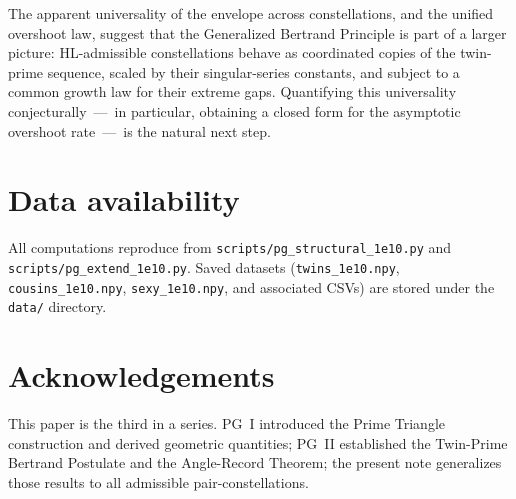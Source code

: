 \documentclass[11pt]{article}
\begin{document}
The apparent universality of the envelope across constellations, and
the unified overshoot law, suggest that the Generalized Bertrand
Principle is part of a larger picture: HL-admissible constellations
behave as coordinated copies of the twin-prime sequence, scaled by
their singular-series constants, and subject to a common growth law
for their extreme gaps. Quantifying this universality
conjecturally~---~in particular, obtaining a closed form for the
asymptotic overshoot rate~---~is the natural next step.

\section*{Data availability}

All computations reproduce from
\texttt{scripts/pg\_structural\_1e10.py} and
\texttt{scripts/pg\_extend\_1e10.py}. Saved datasets
(\texttt{twins\_1e10.npy}, \texttt{cousins\_1e10.npy},
\texttt{sexy\_1e10.npy}, and associated CSVs) are stored under the
\texttt{data/} directory.

\section*{Acknowledgements}

This paper is the third in a series. PG~I introduced the Prime
Triangle construction and derived geometric quantities; PG~II
established the Twin-Prime Bertrand Postulate and the Angle-Record
Theorem; the present note generalizes those results to all
admissible pair-constellations.
\end{document}
